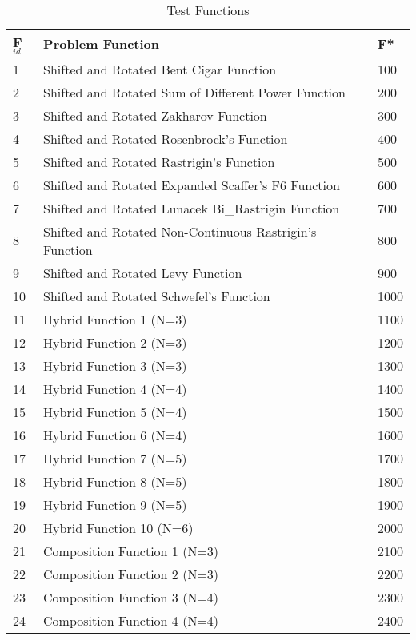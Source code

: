 \begin{table}[!htbp]
\caption{Test Functions}
\vspace{-3mm}
\centering
\begin{tabular}{|p{0.5cm}|p{5.4cm}|p{0.6cm}|}
\hline
F$_{id}$ & Problem Function & F* \\ \hline
1 & Shifted and Rotated Bent Cigar Function & 100 \\
\hline
2 & Shifted and Rotated Sum of Different Power Function & 200 \\
\hline
3 & Shifted and Rotated Zakharov Function & 300\\
\hline
4 & Shifted and Rotated Rosenbrock’s Function & 400\\
\hline
5 & Shifted and Rotated Rastrigin’s Function & 500\\
\hline
6 & Shifted and Rotated Expanded Scaffer’s F6 Function & 600\\
\hline
7 & Shifted and Rotated Lunacek Bi\_Rastrigin Function & 700\\
\hline
8 & Shifted and Rotated Non-Continuous Rastrigin’s Function & 800\\
\hline
9 & Shifted and Rotated Levy Function & 900\\
\hline
10 & Shifted and Rotated Schwefel’s Function & 1000\\
\hline
11 & Hybrid Function 1 (N=3) & 1100\\
\hline
12 & Hybrid Function 2 (N=3) & 1200\\
\hline
13 & Hybrid Function 3 (N=3) & 1300\\
\hline
14 & Hybrid Function 4 (N=4) & 1400\\
\hline
15 & Hybrid Function 5 (N=4) & 1500\\
\hline
16 & Hybrid Function 6 (N=4) & 1600\\
\hline
17 & Hybrid Function 7 (N=5) & 1700\\
\hline
18 & Hybrid Function 8 (N=5) & 1800\\
\hline
19 & Hybrid Function 9 (N=5) & 1900\\
\hline
20 & Hybrid Function 10 (N=6) & 2000\\
\hline
21 & Composition Function 1 (N=3) & 2100\\
\hline
22 & Composition Function 2 (N=3) & 2200\\
\hline
23 & Composition Function 3 (N=4) & 2300\\
\hline
24 & Composition Function 4 (N=4) & 2400\\
\hline

\end{tabular}
\end{table}
